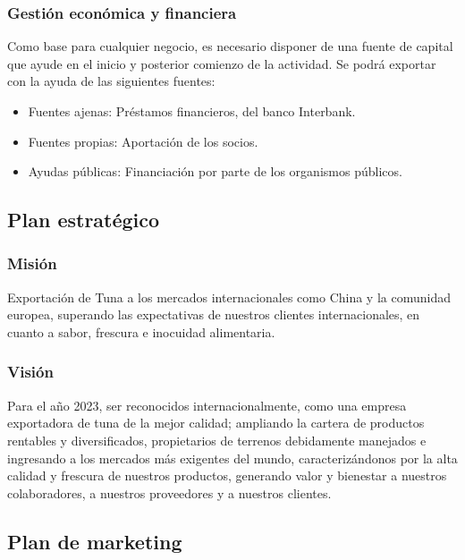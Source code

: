 \documentclass[
  stu,
  floatsintext,
  longtable,
  a4paper,
  nolmodern,
  notxfonts,
  notimes,
  colorlinks=true,linkcolor=blue,citecolor=blue,urlcolor=blue]{apa7}
\begin{document}
\subsubsection{Gestión económica y
financiera}\label{gestiuxf3n-econuxf3mica-y-financiera}

Como base para cualquier negocio, es necesario disponer de una fuente de
capital que ayude en el inicio y posterior comienzo de la actividad. Se
podrá exportar con la ayuda de las siguientes fuentes:

\begin{itemize}
\item
  Fuentes ajenas: Préstamos financieros, del banco Interbank.
\item
  Fuentes propias: Aportación de los socios.
\item
  Ayudas públicas: Financiación por parte de los organismos públicos.
\end{itemize}

\subsection{Plan estratégico}\label{plan-estratuxe9gico}

\subsubsection{Misión}\label{misiuxf3n}

Exportación de Tuna a los mercados internacionales como China y la
comunidad europea, superando las expectativas de nuestros clientes
internacionales, en cuanto a sabor, frescura e inocuidad alimentaria.

\subsubsection{Visión}\label{visiuxf3n}

Para el año 2023, ser reconocidos internacionalmente, como una empresa
exportadora de tuna de la mejor calidad; ampliando la cartera de
productos rentables y diversificados, propietarios de terrenos
debidamente manejados e ingresando a los mercados más exigentes del
mundo, caracterizándonos por la alta calidad y frescura de nuestros
productos, generando valor y bienestar a nuestros colaboradores, a
nuestros proveedores y a nuestros clientes.

\subsection{Plan de marketing}\label{plan-de-marketing}
\end{document}
